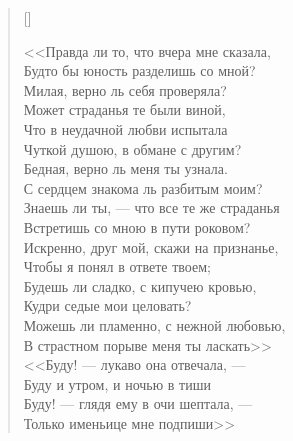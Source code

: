 \settowidth{\versewidth}{\vinБудто бы юность разделишь со мной?}
\begin{verse}[\versewidth]
\begin{altverse}
<<Правда ли то, что вчера мне сказала,\\
    Будто бы юность разделишь со мной?\\
Милая, верно ль себя проверяла?\\
    Может страданья те были виной,\\
Что в неудачной любви испытала\\
    Чуткой душою, в обмане с другим?\\
Бедная, верно ль меня ты узнала.\\
    С сердцем знакома ль разбитым моим?\\
Знаешь ли ты, --- что все те же страданья\\
    Встретишь со мною в пути роковом?\\
Искренно, друг мой, скажи на признанье,\\
    Чтобы я понял в ответе твоем;\\
Будешь ли сладко, с кипучею кровью,\\
    Кудри седые мои целовать?\\
Можешь ли пламенно, с нежной любовью,\\
    В страстном порыве меня ты ласкать\ldotsq>>\\
<<Буду! --- лукаво она отвечала, ---\\
Буду и утром, и ночью в тиши\ldotst\\
Буду! --- глядя ему в очи шептала, ---\\
Только именьице мне подпиши\ldotst>>
\end{altverse}
\end{verse}


